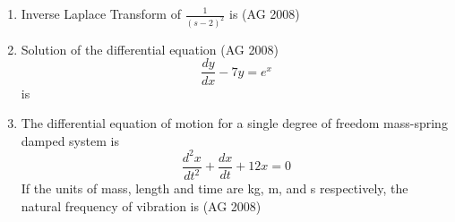 \begin{enumerate}[label=\thesubsection.\arabic*,ref=\thesubsection.\theenumi]
    \begin{enumerate}
        \item $\mathcal{L}\left(\frac{dy}{dt}\right) = \frac{dY}{ds}, \quad \mathcal{L}(t\,y(t)) = sY(s)$
        \item $\mathcal{L}\left(\frac{dy}{dt}\right) = sY(s), \quad \mathcal{L}(t\,y(t)) = -\frac{dY}{ds}$
        \item $\mathcal{L}\left(\frac{dy}{dt}\right) = \frac{dY}{ds}, \quad \mathcal{L}(t\,y(t)) = Y(s-1)$
        \item $\mathcal{L}\left(\frac{dy}{dt}\right) = sY(s), \quad \mathcal{L}(t\,y(t)) = e^{a}Y(s)$
\end{enumerate}
\item 
 Inverse Laplace Transform of $\frac{1}{(s-2)^2}$ is 
\hfill(AG 2008)
\begin{enumerate}
\end{enumerate}
%
\item 
 Solution of the differential equation 
\hfill(AG 2008)
\[\frac{dy}{dx} - 7y = e^x \]
is
\begin{enumerate}
\end{enumerate}
\item 
 The differential equation of motion for a single degree of freedom mass-spring damped system is
\[
\frac{d^2 x}{dt^2} + \frac{d x}{dt} + 12 x = 0
\]
If the units of mass, length and time are kg, m, and s respectively, the natural frequency of vibration is
\hfill(AG 2008)
\begin{enumerate}
\end{enumerate}
\end{enumerate}
